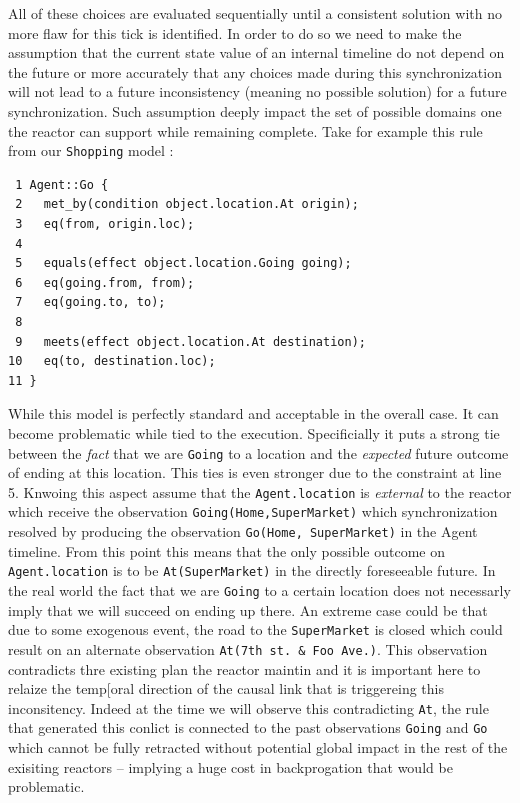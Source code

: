 All of these choices are evaluated sequentially until a consistent
solution with no more flaw for this tick is identified. In order to do
so we need to make the assumption that the current state value of an
internal timeline do not depend on the future or more accurately that
any choices made during this synchronization will not lead to a future
inconsistency (meaning no possible solution) for a future
synchronization. Such assumption deeply impact the set of possible
domains one the reactor can support while remaining complete. Take for
example this rule from our \texttt{Shopping} model :
\begin{verbatim}
 1 Agent::Go {
 2   met_by(condition object.location.At origin);
 3   eq(from, origin.loc);
 4
 5   equals(effect object.location.Going going);
 6   eq(going.from, from);
 7   eq(going.to, to);
 8   
 9   meets(effect object.location.At destination);
10   eq(to, destination.loc);
11 }
\end{verbatim}
While this model is perfectly standard and acceptable in the overall
case. It can become problematic while tied to the
execution. Specificially it puts a strong tie between the {\em fact} that we
are \texttt{Going} to a location and the {\em expected} future outcome  of
ending at this location. This ties is even stronger due to the
constraint at line 5. Knwoing this aspect assume that the
\texttt{Agent.location} is {\em external} to the reactor which receive
the observation \texttt{Going(Home,SuperMarket)} which synchronization
resolved by producing the observation \texttt{Go(Home, SuperMarket)}
in the Agent timeline. From this point this means that the only
possible outcome on \texttt{Agent.location} is to be
\texttt{At(SuperMarket)} in the directly foreseeable future. In the
real world the fact that we are \texttt{Going} to a certain location
does not necessarly imply that we will succeed on ending up there. An
extreme case could be that due to some exogenous event, the road to
the \texttt{SuperMarket} is closed which could result on an alternate
observation \texttt{At(7th st. \& Foo Ave.)}. This observation
contradicts thre existing plan the reactor maintin and it is important
here to relaize the temp[oral direction of the causal link that is
triggereing this inconsitency. Indeed at the time we will observe this
contradicting \texttt{At}, the rule that generated this conlict is
connected to the past observations \texttt{Going} and \texttt{Go}
which cannot be fully retracted without potential global impact in the
rest of the exisiting reactors -- implying  a huge cost in
backprogation that would be problematic. 

